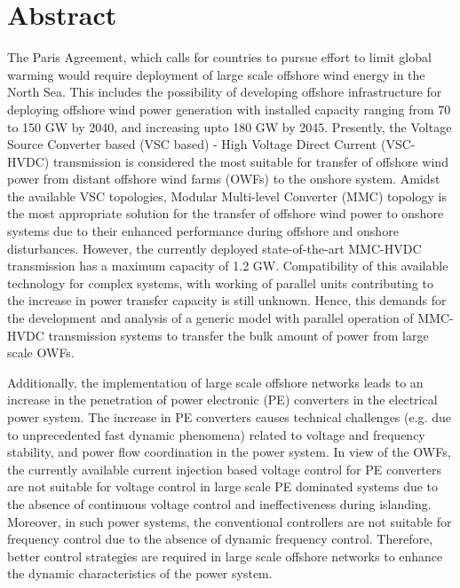 \chapter*{Abstract}



The Paris Agreement, which calls for countries to pursue effort to limit global warming would require deployment of large scale offshore wind energy in the North Sea. This includes the possibility of developing offshore infrastructure for deploying offshore wind power generation with installed capacity ranging from 70 to 150 GW by 2040, and increasing upto 180 GW by 2045. Presently, the Voltage Source Converter based (VSC based) - High Voltage Direct Current (VSC-HVDC) transmission is considered the most suitable for transfer of offshore wind power from distant offshore wind farms (OWFs) to the onshore system. Amidst the available VSC topologies, Modular Multi-level Converter (MMC) topology is the most appropriate  solution for the transfer of offshore wind power to onshore systems due to their enhanced performance during offshore and onshore disturbances. However, the currently deployed state-of-the-art MMC-HVDC transmission has a maximum capacity of 1.2 GW. Compatibility of this available technology for complex systems, with working of parallel units contributing to the increase in power transfer capacity is still unknown. Hence, this demands for the development and analysis of a generic model with parallel operation of MMC-HVDC transmission systems to transfer the bulk amount of power from large scale OWFs. 

Additionally, the implementation of large scale offshore networks leads to an increase in the penetration of power electronic (PE) converters in the electrical power system. The increase in PE converters causes technical challenges (e.g. due to unprecedented fast dynamic phenomena) related to voltage and frequency stability, and power flow coordination in the power system. In view of the OWFs, the currently available current injection based voltage control for PE converters are not suitable for voltage control in large scale PE dominated systems due to the absence of continuous voltage control and ineffectiveness during islanding. Moreover, in such power systems, the conventional controllers are not suitable for frequency control due to the absence of dynamic frequency control. Therefore, better control strategies are required in large scale offshore networks to enhance the dynamic characteristics of the power system. 

